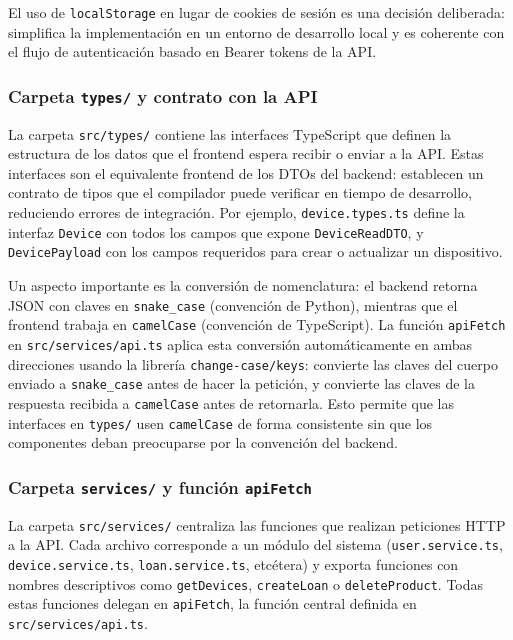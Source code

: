 El uso de \texttt{localStorage} en lugar de cookies de sesión es una decisión 
deliberada: simplifica la implementación en un entorno de desarrollo local y es 
coherente con el flujo de autenticación basado en Bearer tokens de la API.

\subsubsection*{Carpeta \texttt{types/} y contrato con la API}

La carpeta \texttt{src/types/} contiene las interfaces TypeScript que definen la 
estructura de los datos que el frontend espera recibir o enviar a la API. Estas 
interfaces son el equivalente frontend de los DTOs del backend: establecen un 
contrato de tipos que el compilador puede verificar en tiempo de desarrollo, 
reduciendo errores de integración. Por ejemplo, \texttt{device.types.ts} define la 
interfaz \texttt{Device} con todos los campos que expone \texttt{DeviceReadDTO}, y 
\texttt{DevicePayload} con los campos requeridos para crear o actualizar un 
dispositivo.

Un aspecto importante es la conversión de nomenclatura: el backend retorna JSON con 
claves en \texttt{snake\_case} (convención de Python), mientras que el frontend 
trabaja en \texttt{camelCase} (convención de TypeScript). La función \texttt{apiFetch} 
en \texttt{src/services/api.ts} aplica esta conversión automáticamente en ambas 
direcciones usando la librería \texttt{change-case/keys}: convierte las claves del 
cuerpo enviado a \texttt{snake\_case} antes de hacer la petición, y convierte las 
claves de la respuesta recibida a \texttt{camelCase} antes de retornarla. Esto 
permite que las interfaces en \texttt{types/} usen \texttt{camelCase} de forma 
consistente sin que los componentes deban preocuparse por la convención del backend.

\subsubsection*{Carpeta \texttt{services/} y función \texttt{apiFetch}}

La carpeta \texttt{src/services/} centraliza las funciones que realizan peticiones 
HTTP a la API. Cada archivo corresponde a un módulo del sistema 
(\texttt{user.service.ts}, \texttt{device.service.ts}, \texttt{loan.service.ts}, 
etcétera) y exporta funciones con nombres descriptivos como \texttt{getDevices}, 
\texttt{createLoan} o \texttt{deleteProduct}. Todas estas funciones delegan en 
\texttt{apiFetch}, la función central definida en \texttt{src/services/api.ts}.

